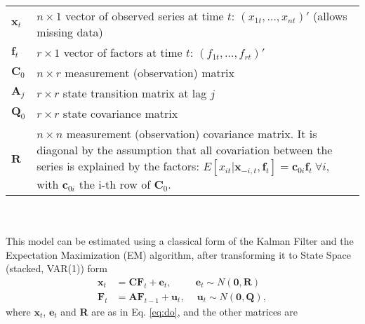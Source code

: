 \documentclass[a4paper]{article}
\begin{document}
\begin{tabular}{p{1cm}p{12cm}}
$\textbf{x}_t$ & $n \times 1$ vector of observed series at time $t$: $(x_{1t}, \dots, x_{nt})'$ (allows missing data)  \\[1em]
$\textbf{f}_t$ & $r \times 1$ vector of factors at time $t$: $(f_{1t}, \dots, f_{rt})'$\\[1em]
$\textbf{C}_0$ & $n \times r$ measurement (observation) matrix\\[1em]
$\textbf{A}_j$ & $r \times r$ state transition matrix at lag $j$ \\[1em]
$\textbf{Q}_0$ & $r \times r$ state covariance matrix\\[1em]
$\textbf{R}$ & $n \times n$ measurement (observation) covariance matrix. It is diagonal by the assumption that all covariation between the series is explained by the factors: $E[x_{it}|\textbf{x}_{-i,t},\textbf{f}_t] = \textbf{c}_{0i}\textbf{f}_t\ \forall i$, with $\textbf{c}_{0i}$ the i-th row of $\textbf{C}_0$.
\end{tabular}
\\\\

This model can be estimated using a classical form of the Kalman Filter and the Expectation Maximization (EM) algorithm, after transforming it to State Space (stacked, VAR(1)) form
\begin{align}
\textbf{x}_t &= \textbf{C} \textbf{F}_t + \textbf{e}_t, \qquad\ \ \textbf{e}_t\sim N(\textbf{0}, \textbf{R}) \\
\textbf{F}_t &= \textbf{AF}_{t-1} + \textbf{u}_t, \quad\ \textbf{u}_t\sim  N(\textbf{0}, \textbf{Q}),
\end{align}
where $\textbf{x}_t$, $\textbf{e}_t$ and \textbf{R} are as in Eq. \ref{eq:do}, and the other matrices are

\newpage
\end{document}
